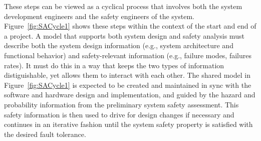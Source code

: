 These steps can be viewed as a cyclical process that involves both the system development engineers and the safety engineers of the system. Figure~\ref{fig:SACycle1} shows these steps within the context of the start and end of a project. A model that supports both system design and safety analysis must describe both the system design information (e.g., system architecture and functional behavior) and safety-relevant information (e.g., failure modes, failures rates). It must do this in a way that keeps the two types of information distiguishable, yet allows them to interact with each other. The shared model in Figure~\ref{fig:SACycle1} is expected to be created and maintained in sync with the software and hardware design and implementation, and guided by the hazard and probability information from the preliminary system safety assessment. This safety information is then used to drive for design changes if necessary and continues in an iterative fashion until the system safety property is satisfied with the desired fault tolerance. 
